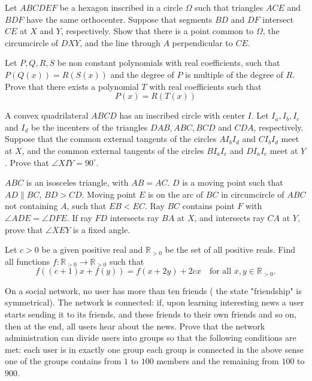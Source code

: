 \documentclass[11pt]{scrartcl}
\begin{document}
\begin{problem}[639126468624733]
Let $ABCDEF$ be a hexagon inscribed in a circle $\Omega$ such that triangles $ACE$ and $BDF$ have the same orthocenter. Suppose that segments $BD$ and $DF$ intersect $CE$ at $X$ and $Y$, respectively. Show that there is a point common to $\Omega$, the circumcircle of $DXY$, and the line through $A$ perpendicular to $CE$.
\end{problem}
\begin{problem}[945040565828830]
Let $P,Q,R,S$ be non constant polynomials with real coefficients, such that $P(Q(x))=R(S(x)) $ and the degree of $P$ is multiple of the degree of $R. $ Prove that there exists a polynomial $T$ with real coefficients such that
$$\displaystyle P(x)=R(T(x))$$
\end{problem}
\begin{problem}[4451072691230235426]
A convex quadrilateral $ABCD$ has an inscribed circle with center $I$. Let $I_a, I_b, I_c$ and $I_d$ be the incenters of the triangles $DAB, ABC, BCD$ and $CDA$, respectively. Suppose that the common external tangents of the circles $AI_bI_d$ and $CI_bI_d$ meet at $X$, and the common external tangents of the circles $BI_aI_c$ and $DI_aI_c$ meet at $Y$. Prove that $\angle{XIY}=90^{\circ}$.
\end{problem}
\begin{problem}[215375559035207]
$ABC$ is an isosceles triangle, with $AB=AC$. $D$ is a moving point such that $AD\parallel BC$, $BD>CD$. Moving point $E$ is on the arc of $BC$ in circumcircle of $ABC$ not containing $A$, such that $EB<EC$. Ray $BC$ contains point $F$ with $\angle ADE=\angle DFE$. If ray $FD$ intersects ray $BA$ at $X$, and intersects ray $CA$ at $Y$, prove that $\angle XEY$ is a fixed angle.
\end{problem}
\begin{problem}[878429961754697605]
Let $c>0$ be a given positive real and $\mathbb{R}_{>0}$ be the set of all positive reals. Find all functions $f \colon \mathbb{R}_{>0} \to \mathbb{R}_{>0}$ such that\[f((c+1)x+f(y))=f(x+2y)+2cx \quad \textrm{for all } x,y \in \mathbb{R}_{>0}.\]
\end{problem}
\begin{problem}[6029540617185205962]
On a social network, no user has more than ten friends ( the state "friendship" is symmetrical). The network is connected: if, upon learning interesting news a user starts sending it to its friends, and these friends to their own friends and so on, then at the end, all users hear about the news.
Prove that the network administration can divide users into groups so that the following conditions are met:
each user is in exactly one group
each group is connected in the above sense
one of the groups contains from $1$ to $100$ members and the remaining from $100$ to $900$.
\end{problem}
\end{document}

